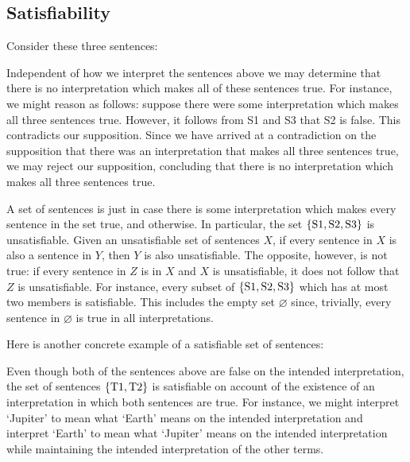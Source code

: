 \subsection{Satisfiability}

Consider these three sentences:

\begin{earg}
\end{earg}

Independent of how we interpret the sentences above we may determine that there is no interpretation which makes all of these sentences true. 
For instance, we might reason as follows: suppose there were some interpretation which makes all three sentences true.
However, it follows from S1 and S3 that S2 is false.
This contradicts our supposition.
Since we have arrived at a contradiction on the supposition that there was an interpretation that makes all three sentences true, we may reject our supposition, concluding that there is no interpretation which makes all three sentences true.

A set of sentences is  just in case there is some interpretation which makes every sentence in the set true, and  otherwise.
In particular, the set $\lbrace\text{S1}, \text{S2}, \text{S3}\rbrace$ is unsatisfiable.
Given an unsatisfiable set of sentences $X$, if every sentence in $X$ is also a sentence in $Y$, then $Y$ is also unsatisfiable. 
The opposite, however, is not true: if every sentence in $Z$ is in $X$ and $X$ is unsatisfiable, it does not follow that $Z$ is unsatisfiable. 
For instance, every subset of $\lbrace\text{S1}, \text{S2}, \text{S3}\rbrace$ which has at most two members is satisfiable.
This includes the empty set $\varnothing$ since, trivially, every sentence in $\varnothing$ is true in all interpretations.

Here is another concrete example of a satisfiable set of sentences:

\begin{earg}
\end{earg}

Even though both of the sentences above are false on the intended interpretation, the set of sentences $\lbrace\text{T1}, \text{T2}\rbrace$ is satisfiable on account of the existence of an interpretation in which both sentences are true.
For instance, we might interpret `Jupiter' to mean what `Earth' means on the intended interpretation and interpret `Earth' to mean what `Jupiter' means on the intended interpretation while maintaining the intended interpretation of the other terms.

